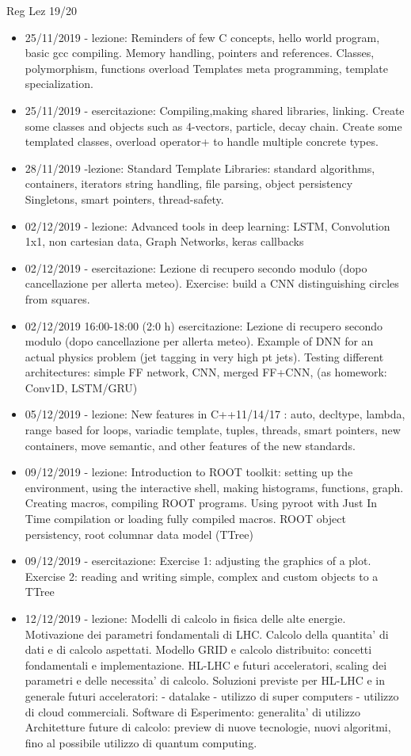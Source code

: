 \begin{frame}[allowframebreaks]{Reg Lez 19/20}
\begin{itemize}[resume]
\item 25/11/2019 - lezione: Reminders of few C concepts, hello world program, basic gcc compiling. Memory handling, pointers and references. Classes, polymorphism, functions overload Templates meta programming, template specialization.
\item 25/11/2019 - esercitazione: Compiling,making shared libraries, linking. Create some classes and objects such as 4-vectors, particle, decay chain. Create some templated classes, overload operator+ to handle multiple concrete types.
\item 28/11/2019 -lezione: Standard Template Libraries: standard algorithms, containers, iterators string handling, file parsing, object persistency Singletons, smart pointers, thread-safety.
\item 02/12/2019 - lezione: Advanced tools in deep learning: LSTM, Convolution 1x1, non cartesian data, Graph Networks, keras callbacks
\item 02/12/2019 - esercitazione: Lezione di recupero secondo modulo (dopo cancellazione per allerta meteo). Exercise: build a CNN distinguishing circles from squares.
\item 02/12/2019 16:00-18:00 (2:0 h) esercitazione: Lezione di recupero secondo modulo (dopo cancellazione per allerta meteo). Example of DNN for an actual physics problem (jet tagging in very high pt jets). Testing different architectures: simple FF network, CNN, merged FF+CNN, (as homework: Conv1D, LSTM/GRU)
\item 05/12/2019 - lezione: New features in C++11/14/17 : auto, decltype, lambda, range based for loops, variadic template, tuples, threads, smart pointers, new containers, move semantic, and other features of the new standards.
\item 09/12/2019 - lezione: Introduction to ROOT toolkit: setting up the environment, using the interactive shell, making histograms, functions, graph. Creating macros, compiling ROOT programs. Using pyroot with Just In Time compilation or loading fully compiled macros. ROOT object persistency, root columnar data model (TTree)
\item 09/12/2019 - esercitazione: Exercise 1: adjusting the graphics of a plot. Exercise 2: reading and writing simple, complex and custom objects to a TTree
\item 12/12/2019 - lezione: Modelli di calcolo in fisica delle alte energie. Motivazione dei parametri fondamentali di LHC. Calcolo della quantita' di dati e di calcolo aspettati. Modello GRID e calcolo distribuito: concetti fondamentali e implementazione. HL-LHC e futuri acceleratori, scaling dei parametri e delle necessita' di calcolo. Soluzioni previste per HL-LHC e in generale futuri acceleratori: - datalake - utilizzo di super computers - utilizzo di cloud commerciali. Software di Esperimento: generalita' di utilizzo Architetture future di calcolo: preview di nuove tecnologie, nuovi algoritmi, fino al possibile utilizzo di quantum computing.
\end{itemize}
\end{frame}
